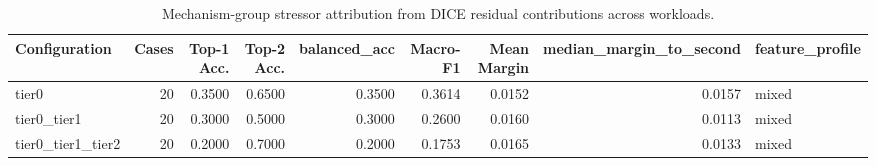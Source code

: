 \begin{table}[t]
\centering
\caption{Mechanism-group stressor attribution from DICE residual contributions across workloads.}
\label{tab:dice_stressor_diagnosis}
\footnotesize
\begin{tabular}{lrrrrrrrl}
\toprule
Configuration & Cases & Top-1 Acc. & Top-2 Acc. & balanced_acc & Macro-F1 & Mean Margin & median_margin_to_second & feature_profile \\
\midrule
tier0 & 20 & 0.3500 & 0.6500 & 0.3500 & 0.3614 & 0.0152 & 0.0157 & mixed \\
tier0_tier1 & 20 & 0.3000 & 0.5000 & 0.3000 & 0.2600 & 0.0160 & 0.0113 & mixed \\
tier0_tier1_tier2 & 20 & 0.2000 & 0.7000 & 0.2000 & 0.1753 & 0.0165 & 0.0133 & mixed \\
\bottomrule
\end{tabular}

\end{table}
